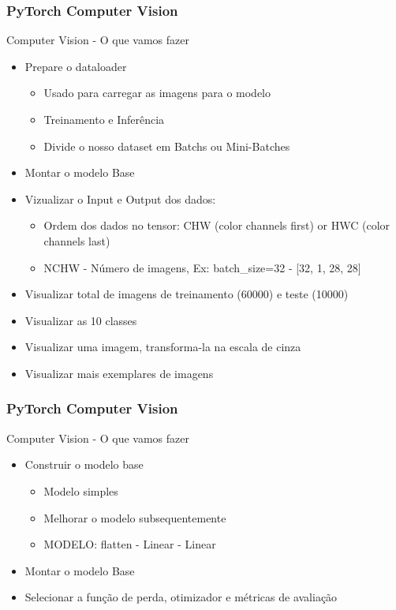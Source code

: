 \documentclass{beamer}
\begin{document}
\begin{frame}
	\frametitle{PyTorch Computer Vision}
	\begin{block}{Computer Vision - O que vamos fazer}
		\begin{itemize}
			\item Prepare o dataloader
			\begin{itemize}
				\item Usado para carregar as imagens para o modelo
				\item Treinamento e Inferência
				\item Divide o nosso dataset em Batchs ou Mini-Batches
			\end{itemize}
			\item Montar o modelo Base
			\item Vizualizar o Input e Output dos dados:
			\begin{itemize}
				\item Ordem dos dados no tensor: CHW (color channels first) or HWC (color channels last)
				\item NCHW - Número de imagens, Ex: batch\_size=32 - [32, 1, 28, 28]
			\end{itemize}
			\item Visualizar total de imagens de treinamento (60000) e teste (10000)
			\item Visualizar as 10 classes
			\item Visualizar uma imagem, transforma-la na escala de cinza
			\item Visualizar mais exemplares de imagens
		\end{itemize}
	\end{block}
\end{frame}
\begin{frame}
	\frametitle{PyTorch Computer Vision}
	\begin{block}{Computer Vision - O que vamos fazer}
		\begin{itemize}
			\item Construir o modelo base
			\begin{itemize}
				\item Modelo simples
				\item Melhorar o modelo subsequentemente
				\item MODELO: flatten - Linear - Linear
			\end{itemize}
			\item Montar o modelo Base
			\item Selecionar a função de perda, otimizador e métricas de avaliação
		\end{itemize}
	\end{block}
\end{frame}
\end{document}
